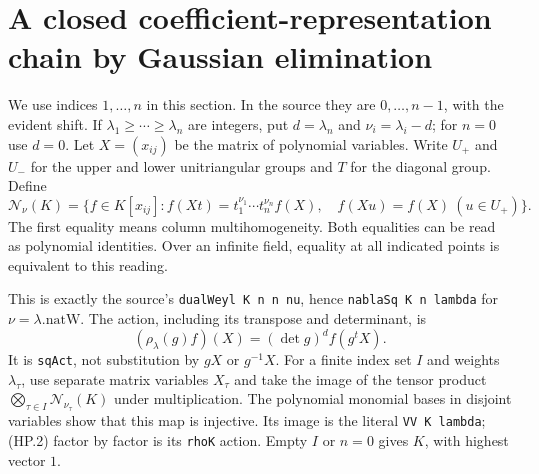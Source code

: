 \section{A closed coefficient-representation chain by Gaussian elimination}
\label{sec:highest-weight-closure}


We use indices $1,\ldots,n$ in this section.  In the source they are
$0,\ldots,n-1$, with the evident shift.  If $\lambda_1\ge\cdots\ge\lambda_n$
are integers, put $d=\lambda_n$ and $\nu_i=\lambda_i-d$; for $n=0$ use
$d=0$.  Let $X=(x_{ij})$ be the matrix of polynomial variables.  Write
$U_+$ and $U_-$ for the upper and lower unitriangular groups and $T$ for
the diagonal group.  Define
\[
 \mathcal N_\nu(K)=\{f\in K[x_{ij}]:
 f(Xt)=t_1^{\nu_1}\cdots t_n^{\nu_n}f(X),\quad
 f(Xu)=f(X)\ (u\in U_+)\}.
 \tag{HP.1}
\]
The first equality means column multihomogeneity.  Both equalities can
be read as polynomial identities.  Over an infinite field, equality at
all indicated points is equivalent to this reading.

This is exactly the source's \texttt{dualWeyl K n n nu}, hence
\texttt{nablaSq K n lambda} for $\nu=\lambda.\mathrm{natW}$.
The action, including its transpose and determinant, is
\[
       (\rho_\lambda(g)f)(X)=(\det g)^d f(g^tX).
 \tag{HP.2}
\]
It is \texttt{sqAct}, not substitution by $gX$ or $g^{-1}X$.
For a finite index set $I$ and weights $\lambda_\tau$, use separate
matrix variables $X_\tau$ and take the image of the tensor product
$\bigotimes_{\tau\in I}\mathcal N_{\nu_\tau}(K)$ under multiplication.
The polynomial monomial bases in disjoint variables show that this
map is injective.  Its image is the literal \texttt{VV K lambda};
(HP.2) factor by factor is its \texttt{rhoK} action.  Empty $I$ or
$n=0$ gives $K$, with highest vector $1$.

